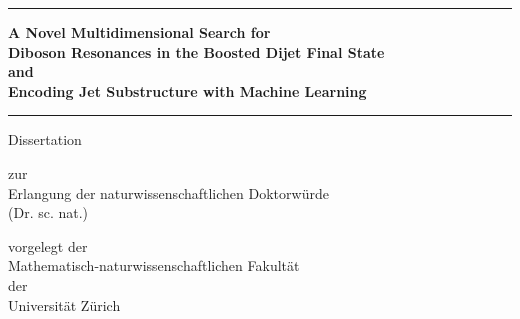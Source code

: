 \begin{center}

  \thispagestyle{empty}
  {\parindent0cm
   \rule{\linewidth}{.4ex}}
  \begin{center}

    \bfseries\large
    A Novel Multidimensional Search for\\ 
    Diboson Resonances in the Boosted Dijet Final State\\
    \vspace{0.2 in}
    and\\
    \vspace{0.2 in}
    Encoding Jet Substructure with Machine Learning\\
  \end{center}
  \rule{\linewidth}{.4ex}

\par
\vspace{0.2 in}

{\large Dissertation}
\vspace{0.1in}

zur \\
Erlangung der 
naturwissenschaftlichen Doktorw\"urde \\
(Dr. sc. nat.) \\
\par
\vspace{0.2in}


vorgelegt der\\
Mathematisch-naturwissenschaftlichen Fakult\"at \\
der \\
\vspace{0.05in}
{\large Universit\"at Z\"urich}
\par


\end{center}
